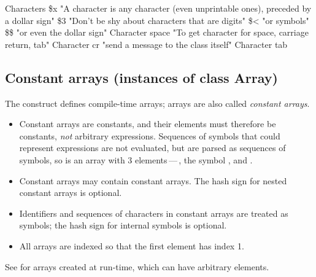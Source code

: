\documentclass[a4paper,10pt,twoside]{book}
\begin{document}
\begin{script}{Characters}
\$x "A character is any character (even unprintable ones), preceded by a dollar sign"
\$3 "Don't be shy about characters that are digits"
\$< "or symbols"
\$\$ "or even the dollar sign"
Character space "To get character for space, carriage return, tab"
Character cr "send a message to the class itself"
Character tab
\end{script}

\subsection{Constant arrays (instances of class Array)}
The \ct{#()} construct defines compile-time  arrays;
\ct{#()} arrays are also called \textit{constant arrays}.

\begin{itemize}
\item Constant arrays are constants, and their elements must therefore be constants, \emph{not} arbitrary expressions.
Sequences of symbols that could represent expressions are not evaluated, but are parsed as sequences of symbols, so  is an array with 3 elements\,---\,, the symbol \ct{#+}, and .
\item Constant arrays may contain constant arrays. The hash sign for nested constant arrays is optional.
\item Identifiers and sequences of characters in constant arrays are treated as symbols; the hash sign for internal symbols is optional.
\item All arrays are indexed so that the first element has index 1.
\end{itemize}

\noindent
See  for arrays created at run-time, which can have arbitrary elements.

\end{document}
